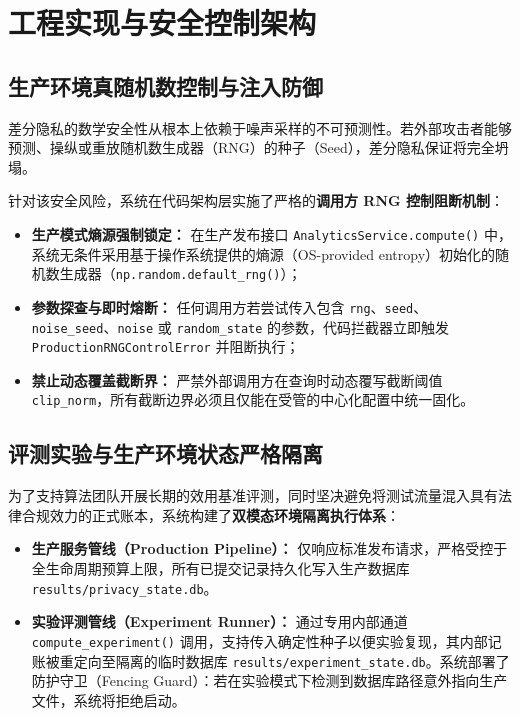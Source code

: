 \section{工程实现与安全控制架构}
\label{sec:engineering}

\subsection{生产环境真随机数控制与注入防御}
差分隐私的数学安全性从根本上依赖于噪声采样的不可预测性。若外部攻击者能够预测、操纵或重放随机数生成器（RNG）的种子（Seed），差分隐私保证将完全坍塌。

针对该安全风险，系统在代码架构层实施了严格的\textbf{调用方 RNG 控制阻断机制}：
\begin{itemize}[leftmargin=2em]
  \item \textbf{生产模式熵源强制锁定：} 在生产发布接口 \texttt{AnalyticsService.compute()} 中，系统无条件采用基于操作系统提供的熵源（OS-provided entropy）初始化的随机数生成器（\texttt{np.random.default\_rng()}）；
  \item \textbf{参数探查与即时熔断：} 任何调用方若尝试传入包含 \texttt{rng}、\texttt{seed}、\texttt{noise\_seed}、\texttt{noise} 或 \texttt{random\_state} 的参数，代码拦截器立即触发 \texttt{ProductionRNGControlError} 并阻断执行；
  \item \textbf{禁止动态覆盖截断界：} 严禁外部调用方在查询时动态覆写截断阈值 \texttt{clip\_norm}，所有截断边界必须且仅能在受管的中心化配置中统一固化。
\end{itemize}

\subsection{评测实验与生产环境状态严格隔离}
为了支持算法团队开展长期的效用基准评测，同时坚决避免将测试流量混入具有法律合规效力的正式账本，系统构建了\textbf{双模态环境隔离执行体系}：
\begin{itemize}[leftmargin=2em]
  \item \textbf{生产服务管线（Production Pipeline）：} 仅响应标准发布请求，严格受控于全生命周期预算上限，所有已提交记录持久化写入生产数据库 \texttt{results/privacy\_state.db}。
  \item \textbf{实验评测管线（Experiment Runner）：} 通过专用内部通道 \texttt{compute\_experiment()} 调用，支持传入确定性种子以便实验复现，其内部记账被重定向至隔离的临时数据库 \texttt{results/experiment\_state.db}。系统部署了防护守卫（Fencing Guard）：若在实验模式下检测到数据库路径意外指向生产文件，系统将拒绝启动。
\end{itemize}

